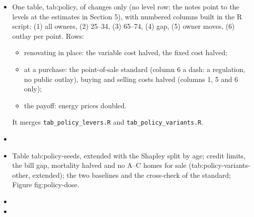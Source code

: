 \begin{itemize}
  \item {} One table, tab:policy, of changes only (no level row;
    the notes point to the levels at the estimates in Section 5), with
    numbered columns built in the R script: (1) all owners, (2) 25--34,
    (3) 65--74, (4) gap, (5) owner moves, (6) outlay per point. Rows:
    \begin{itemize}
      \item renovating in place: the variable cost halved, the fixed cost
        halved;
      \item at a purchase: the point-of-sale standard (column 6 a dash: a
        regulation, no public outlay), buying and selling costs halved
        (columns 1, 5 and 6 only);
      \item the payoff: energy prices doubled.
    \end{itemize}
    It merges \texttt{tab\_policy\_levers.R} and
    \texttt{tab\_policy\_variants.R}.
  \item {}
  \item {} Table tab:policy-seeds, extended with the Shapley
    split by age; credit limits, the bill gap, mortality halved and no A--C
    homes for sale (tab:policy-variants-other, extended); the two baselines
    and the cross-check of the standard; Figure fig:policy-dose.
  \item {}
  \item {}
\end{itemize}
